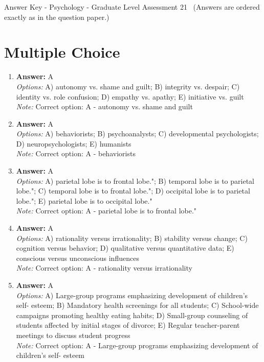 \documentclass[12pt]{article}
\begin{document}
\begin{center}
Answer Key - Psychology - Graduate Level Assessment 21 \
\small (Answers are ordered exactly as in the question paper.)
\end{center}

\section*{Multiple Choice}
\begin{enumerate}[label=\arabic*.]
\item \textbf{Answer:} A
\\ \textit{Options:} A) autonomy vs. shame and guilt; B) integrity vs. despair; C) identity vs. role confusion; D) empathy vs. apathy; E) initiative vs. guilt
\\ \textit{Note:} Correct option: A - autonomy vs. shame and guilt
\item \textbf{Answer:} A
\\ \textit{Options:} A) behaviorists; B) psychoanalysts; C) developmental psychologists; D) neuropsychologists; E) humanists
\\ \textit{Note:} Correct option: A - behaviorists
\item \textbf{Answer:} A
\\ \textit{Options:} A) parietal lobe is to frontal lobe."; B) temporal lobe is to parietal lobe."; C) temporal lobe is to frontal lobe."; D) occipital lobe is to parietal lobe."; E) parietal lobe is to occipital lobe."
\\ \textit{Note:} Correct option: A - parietal lobe is to frontal lobe."
\item \textbf{Answer:} A
\\ \textit{Options:} A) rationality versus irrationality; B) stability versus change; C) cognition versus behavior; D) qualitative versus quantitative data; E) conscious versus unconscious influences
\\ \textit{Note:} Correct option: A - rationality versus irrationality
\item \textbf{Answer:} A
\\ \textit{Options:} A) Large-group programs emphasizing development of children's self- esteem; B) Mandatory health screenings for all students; C) School-wide campaigns promoting healthy eating habits; D) Small-group counseling of students affected by initial stages of divorce; E) Regular teacher-parent meetings to discuss student progress
\\ \textit{Note:} Correct option: A - Large-group programs emphasizing development of children's self- esteem
\end{enumerate}
\end{document}
